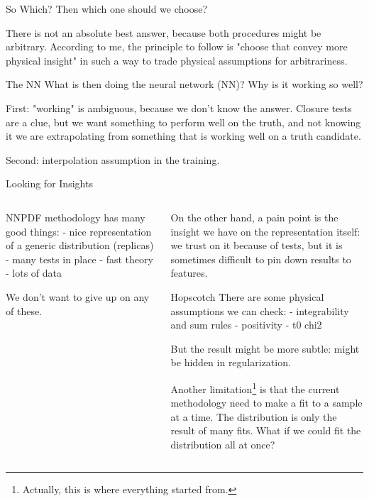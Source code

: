 \documentclass[9pt]{beamer}
\begin{document}
\begin{frame}{So Which?}
    Then which one should we choose?

    There is not an absolute best answer, because both procedures might be arbitrary.
    According to me, the principle to follow is "choose that convey more
    physical insight" in such a way to trade physical assumptions for arbitrariness.
\end{frame}

\begin{frame}{The NN}
    What is then doing the neural network (NN)? Why is it working so well?

    First: "working" is ambiguous, because we don't know the answer. Closure
    tests are a clue, but we want something to perform well on the truth, and
    not knowing it we are extrapolating from something that is working well on
    a truth candidate.

    Second: interpolation assumption in the training.
\end{frame}

\begin{frame}{Looking for Insights}
    \begin{columns}
        \begin{column}{0.5\textwidth}
            NNPDF methodology has many good things:
            - nice representation of a generic distribution (replicas)
            - many tests in place
            - fast theory
            - lots of data

            We don't want to give up on any of these.
        \end{column}

        \begin{column}{0.5\textwidth}
            On the other hand, a pain point is the insight we have on the
            representation itself: we trust on it because of tests, but it is sometimes
            difficult to pin down results to features.

            \begin{exampleblock}{Hopscotch}
                There are some physical assumptions we can check:
                - integrability and sum rules
                - positivity
                - t0 chi2

                But the result might be more subtle: might be hidden in regularization.
            \end{exampleblock}

            Another limitation\footnote{Actually, this is where everything started
            from.} is that the current methodology need to make a fit to a sample at a
            time. The distribution is only the result of many fits.
            What if we could fit the distribution all at once?
            \vspace*{20pt}
        \end{column}
    \end{columns}
\end{frame}
\end{document}
